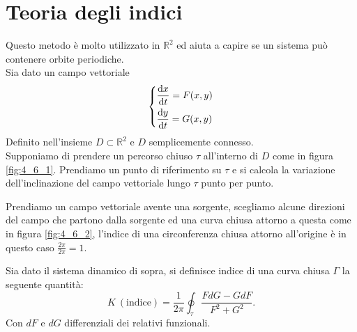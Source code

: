 \section{Teoria degli indici}%
\label{sub:Teoria degli indici}
Questo metodo è molto utilizzato in $\mathbb{R}^2$ ed aiuta a capire se un sistema può contenere orbite periodiche.\\
Sia dato un campo vettoriale 
\[
\begin{dcases}
    \frac{\text{d} x}{\text{d} t} = F(x, y) \\
    \frac{\text{d} y}{\text{d} t} = G(x, y) 
\end{dcases}
\]
Definito nell'insieme $D \subset \mathbb{R}^2$ e $D$ semplicemente connesso.\\
Supponiamo di prendere un percorso chiuso $\tau$ all'interno di $D$ come in figura \ref{fig:4_6_1}. Prendiamo un punto di riferimento su $\tau$ e si calcola la variazione dell'inclinazione del campo vettoriale lungo $\tau$ punto per punto.
\begin{exmp}[]
	Prendiamo un campo vettoriale avente una sorgente, scegliamo alcune direzioni del campo che partono dalla sorgente ed una curva chiusa attorno a questa come in figura \ref{fig:4_6_2}, l'indice di una circonferenza chiusa attorno all'origine è in questo caso $\frac{2\pi}{2\pi}=1$.
\end{exmp}
\noindent
\begin{defn}
    Sia dato il sistema dinamico di sopra, si definisce indice di una curva chiusa $\Gamma$ la seguente quantità:
    \[
	K \ (\text{indice}) = \frac{1}{2\pi}\oint_{\tau} \frac{FdG-GdF}{F^2+G^2}
    .\] 
    Con $dF$ e $dG$ differenziali dei relativi funzionali.
\end{defn}
\noindent
